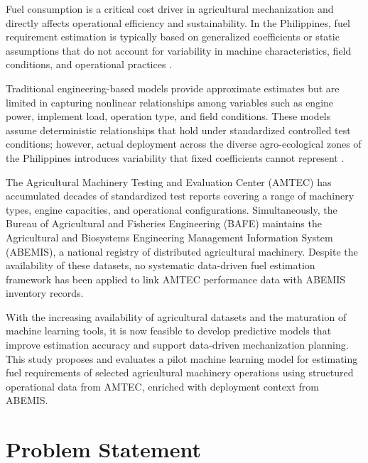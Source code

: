\documentclass[conference]{IEEEtran}
\begin{document}
Fuel consumption is a critical cost driver in agricultural mechanization and directly affects operational efficiency and sustainability. In the Philippines, fuel requirement estimation is typically based on generalized coefficients or static assumptions that do not account for variability in machine characteristics, field conditions, and operational practices \cite{domsch1999fuel}.

Traditional engineering-based models provide approximate estimates but are limited in capturing nonlinear relationships among variables such as engine power, implement load, operation type, and field conditions. These models assume deterministic relationships that hold under standardized controlled test conditions; however, actual deployment across the diverse agro-ecological zones of the Philippines introduces variability that fixed coefficients cannot represent \cite{briones2021philippine}.

The Agricultural Machinery Testing and Evaluation Center (AMTEC) has accumulated decades of standardized test reports covering a range of machinery types, engine capacities, and operational configurations. Simultaneously, the Bureau of Agricultural and Fisheries Engineering (BAFE) maintains the Agricultural and Biosystems Engineering Management Information System (ABEMIS), a national registry of distributed agricultural machinery. Despite the availability of these datasets, no systematic data-driven fuel estimation framework has been applied to link AMTEC performance data with ABEMIS inventory records.

With the increasing availability of agricultural datasets and the maturation of machine learning tools, it is now feasible to develop predictive models that improve estimation accuracy and support data-driven mechanization planning. This study proposes and evaluates a pilot machine learning model for estimating fuel requirements of selected agricultural machinery operations using structured operational data from AMTEC, enriched with deployment context from ABEMIS.

\section{Problem Statement}
\end{document}
